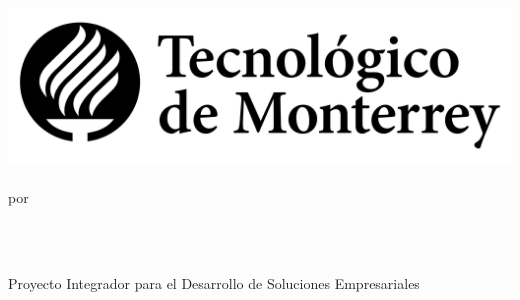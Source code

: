 \documentclass[11pt, a4paper, oneside]{Thesis} %
\title{\ttitle}
\begin{document}
\frontmatter
{}

\fancyhead{}
\rhead{\thepage}
\lhead{}

\pagestyle{fancy}
\newcommand{\HRule}{\rule{\linewidth}{0.5mm}}

\hypersetup{pdfsubject=\subjectname}
\hypersetup{pdfkeywords=\keywordnames}


\begin{titlepage}
\begin{center}

\textsc{\Large \univname}\\
\textsc{\Large \facname}\\
\textsc{\Large \schoolname}\\[1cm]
\graphicspath{ {img/} }
\includegraphics[scale=.3]{logo.png} \\
\\[0.5cm]

\large por\\[0.5cm]

\begin{minipage}{0.4\textwidth}
\begin{center} \large
{} %
\large{\href{mailto:a01703266@tec.mx?subject=Awesome thesis, man!}{\authornames}} 
\\[0.5cm] 
\end{center}
\end{minipage}\\[0.5cm]

\large Proyecto Integrador para el Desarrollo de Soluciones Empresariales \\ \textit{\degreename}\\[0.8cm]


\end{center}
\end{titlepage}
\end{document}
